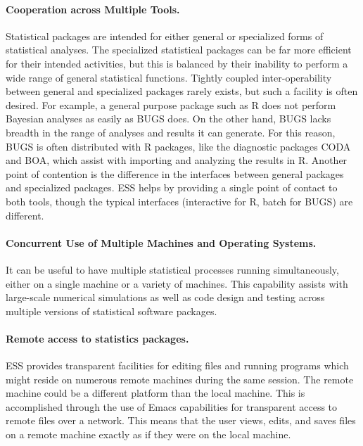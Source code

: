 \documentclass{article}
\begin{document}
\paragraph{Cooperation across Multiple Tools.}
Statistical packages are intended for either general
or %
specialized forms of statistical analyses.  The
specialized statistical packages can be far more efficient for their
intended activities, but this is balanced by their inability to
perform a wide range of general statistical functions.  Tightly
coupled inter-operability between general and specialized packages
rarely exists, but such a facility is often desired.  For example, a
general purpose package such as R does not perform Bayesian analyses
as easily as BUGS does.  On the other hand, BUGS lacks breadth in the
range of analyses and results it can generate.  For this reason, BUGS
is often distributed with R packages, like the diagnostic packages
CODA and BOA, which assist with importing and analyzing the results in
R.  Another point of contention is the difference in the interfaces
between general packages and specialized packages.  ESS helps by
providing a single point of contact to both tools, though the typical
interfaces (interactive for R, batch for BUGS) are different.

\paragraph{Concurrent Use of Multiple Machines and Operating Systems.}
It can be useful to have multiple statistical processes running
simultaneously, either on a single machine or a variety of machines.
This capability assists with large-scale numerical simulations as well
as code design and testing across multiple versions of statistical
software packages.

\paragraph{Remote access to statistics packages.}
ESS provides transparent facilities for editing files and running
programs which might reside on numerous remote machines during the
same session.  The remote machine could be a different platform than
the local machine.  This is accomplished through the use of Emacs
capabilities for transparent access to remote files over a network.
This means that the user views, edits, and saves files on a remote
machine exactly as if they were on the local machine.
\end{document}
